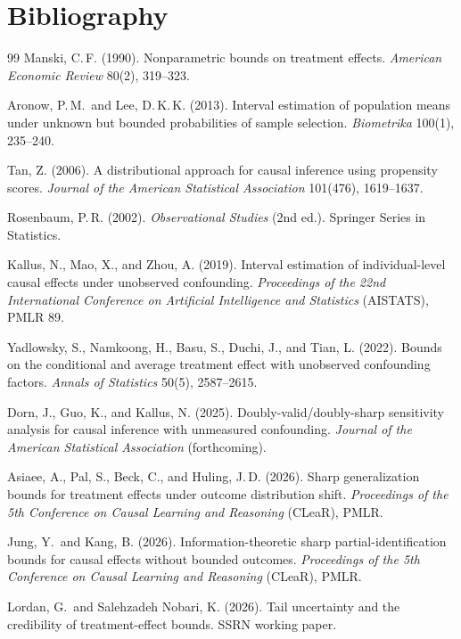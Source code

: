 \documentclass[11pt]{article}
\theoremstyle{definition}
\theoremstyle{plain}
\theoremstyle{remark}
\begin{document}
\section*{Bibliography}
\begin{thebibliography}{99}
Manski, C.\,F. (1990). Nonparametric bounds on treatment effects. \emph{American Economic Review} 80(2), 319--323.

Aronow, P.\,M.\ and Lee, D.\,K.\,K. (2013). Interval estimation of population means under unknown but bounded probabilities of sample selection. \emph{Biometrika} 100(1), 235--240.

Tan, Z. (2006). A distributional approach for causal inference using propensity scores. \emph{Journal of the American Statistical Association} 101(476), 1619--1637.

Rosenbaum, P.\,R. (2002). \emph{Observational Studies} (2nd ed.). Springer Series in Statistics.

Kallus, N., Mao, X., and Zhou, A. (2019). Interval estimation of individual-level causal effects under unobserved confounding. \emph{Proceedings of the 22nd International Conference on Artificial Intelligence and Statistics} (AISTATS), PMLR 89.

Yadlowsky, S., Namkoong, H., Basu, S., Duchi, J., and Tian, L. (2022). Bounds on the conditional and average treatment effect with unobserved confounding factors. \emph{Annals of Statistics} 50(5), 2587--2615.

Dorn, J., Guo, K., and Kallus, N. (2025). Doubly-valid/doubly-sharp sensitivity analysis for causal inference with unmeasured confounding. \emph{Journal of the American Statistical Association} (forthcoming).

Asiaee, A., Pal, S., Beck, C., and Huling, J.\,D. (2026). Sharp generalization bounds for treatment effects under outcome distribution shift. \emph{Proceedings of the 5th Conference on Causal Learning and Reasoning} (CLeaR), PMLR.

Jung, Y.\ and Kang, B. (2026). Information-theoretic sharp partial-identification bounds for causal effects without bounded outcomes. \emph{Proceedings of the 5th Conference on Causal Learning and Reasoning} (CLeaR), PMLR.

Lordan, G.\ and Salehzadeh Nobari, K. (2026). Tail uncertainty and the credibility of treatment-effect bounds. SSRN working paper.


\end{thebibliography}
\end{document}
